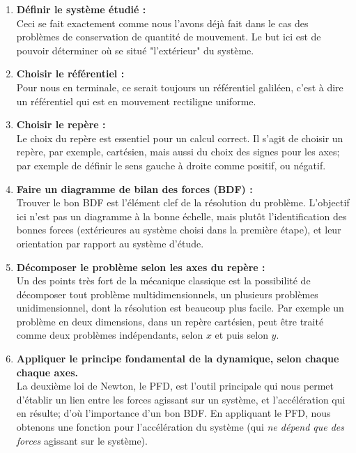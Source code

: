 \documentclass[11pt,a4paper]{article}
\begin{document}
\begin{mdframed}[backgroundcolor=blue!5]

\begin{enumerate}
    \item \textbf{Définir le système étudié : } \\
    Ceci se fait exactement comme nous l'avons déjà fait dans le cas des problèmes de conservation de quantité de mouvement. Le but ici est de pouvoir déterminer où se situé "l'extérieur" du système. 
    \item \textbf{Choisir le référentiel :} \\
    Pour nous en terminale, ce serait toujours un référentiel galiléen, c'est à dire un référentiel qui est en mouvement rectiligne uniforme. 
    \item \textbf{Choisir le repère : }\\
    Le choix du repère est essentiel pour un calcul correct. Il s'agit de choisir un repère, par exemple, cartésien, mais aussi du choix des signes pour les axes; par exemple de définir le sens gauche à droite comme positif, ou négatif.   
    \item \textbf{Faire un diagramme de bilan des forces (BDF) : }\\
    Trouver le bon BDF est l'élément clef de la résolution du problème. L'objectif ici n'est pas un diagramme à la bonne échelle, mais plutôt l'identification des bonnes forces (extérieures au système choisi dans la première étape), et leur orientation par rapport au système d'étude. 
    \item \textbf{Décomposer le problème selon les axes du repère : } \\
    Un des points très fort de la mécanique classique est la possibilité de décomposer tout problème multidimensionnels, un plusieurs problèmes unidimensionnel, dont la résolution est beaucoup plus facile. Par exemple un problème en deux dimensions, dans un repère cartésien, peut être traité comme deux problèmes indépendants, selon $x$ et puis selon $y$. 
    \item \textbf{Appliquer le principe fondamental de la dynamique, selon chaque chaque axes. }\\
    La deuxième loi de Newton, le PFD, est l'outil principale qui nous permet d'établir un lien entre les forces agissant sur un système, et l'accélération qui en résulte; d'où l'importance d'un bon BDF. En appliquant le PFD, nous obtenons une fonction pour l'accélération du système (qui \textit{ne dépend que des forces} agissant sur le système). 

\end{enumerate}
\end{mdframed}
\end{document}
